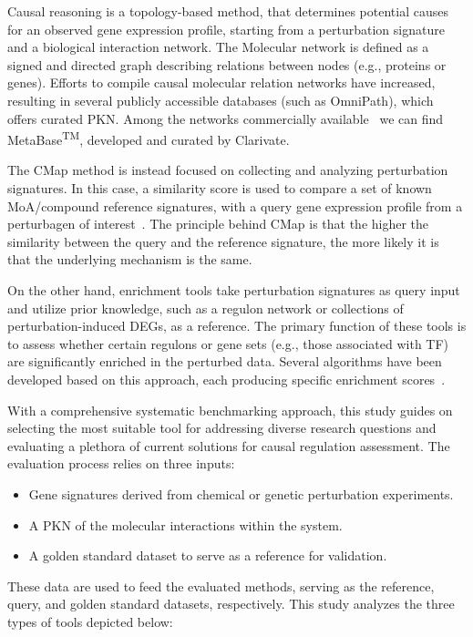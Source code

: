 Causal reasoning is a topology-based method, that determines potential causes for an observed gene expression profile, starting from a perturbation signature and a biological interaction network. 
The \gls{Molecular network} is defined as a signed and directed graph describing relations between nodes (e.g., proteins or genes). 
Efforts to compile causal molecular relation networks have increased, resulting in several publicly accessible databases (such as OmniPath), which offers curated \gls{PKN}. 
Among the networks commercially available~\cite{RN32} we can find MetaBase\textsuperscript{TM}, developed and curated by Clarivate.

The \gls{CMap} method is instead focused on collecting and analyzing perturbation signatures. 
In this case, a similarity score is used to compare a set of known \gls{MoA}/compound reference signatures, with a query gene expression profile from a perturbagen of interest~\cite{RN34, RN31}.
The principle behind \gls{CMap} is that the higher the similarity between the query and the reference signature, the more likely it is that the underlying mechanism is the same. 

On the other hand, enrichment tools take perturbation signatures as query input and utilize prior knowledge, such as a regulon network or collections of perturbation-induced \gls{DEGs}, as a reference. 
The primary function of these tools is to assess whether certain regulons or gene sets (e.g., those associated with \gls{TF}) are significantly enriched in the perturbed data. 
Several algorithms have been developed based on this approach, each producing specific enrichment scores~\cite{RN35}.

With a comprehensive systematic benchmarking approach, this study guides on selecting the most suitable tool for addressing diverse research questions and evaluating a plethora of current solutions for causal regulation assessment. 
The evaluation process relies on three inputs:

\begin{itemize}
  \item \gls{Gene signature}s derived from chemical or genetic perturbation experiments.
  \item A \gls{PKN} of the molecular interactions within the system. 
  \item A golden standard dataset to serve as a reference for validation.
\end{itemize}

These data are used to feed the evaluated methods, serving as the reference, query, and golden standard datasets, respectively. 
This study analyzes the three types of tools depicted below: 

